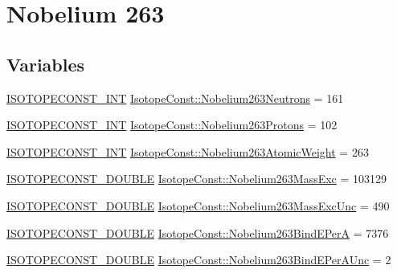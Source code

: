 \hypertarget{group___isotope_const-_nobelium-_no263}{}\section{Nobelium 263}
\label{group___isotope_const-_nobelium-_no263}
\subsection*{Variables}
\begin{DoxyCompactItemize}
\item 
\mbox{\hyperlink{group___isotope_const-_macros_ga5f18360b3e99483a35c32d789e62621c}{I\+S\+O\+T\+O\+P\+E\+C\+O\+N\+S\+T\+\_\+\+I\+NT}} \mbox{\hyperlink{group___isotope_const-_nobelium-_no263_gaed4156afb538ce2c36378a25ada4008c}{Isotope\+Const\+::\+Nobelium263\+Neutrons}} = 161
\item 
\mbox{\hyperlink{group___isotope_const-_macros_ga5f18360b3e99483a35c32d789e62621c}{I\+S\+O\+T\+O\+P\+E\+C\+O\+N\+S\+T\+\_\+\+I\+NT}} \mbox{\hyperlink{group___isotope_const-_nobelium-_no263_ga6154b5a9ceac61e70e11601ed8ffc2dc}{Isotope\+Const\+::\+Nobelium263\+Protons}} = 102
\item 
\mbox{\hyperlink{group___isotope_const-_macros_ga5f18360b3e99483a35c32d789e62621c}{I\+S\+O\+T\+O\+P\+E\+C\+O\+N\+S\+T\+\_\+\+I\+NT}} \mbox{\hyperlink{group___isotope_const-_nobelium-_no263_ga91f92e14a512138d7ae864bbab7fe4e2}{Isotope\+Const\+::\+Nobelium263\+Atomic\+Weight}} = 263
\item 
\mbox{\hyperlink{group___isotope_const-_macros_ga8f45a7272ce02c0b4c65c44636ed719a}{I\+S\+O\+T\+O\+P\+E\+C\+O\+N\+S\+T\+\_\+\+D\+O\+U\+B\+LE}} \mbox{\hyperlink{group___isotope_const-_nobelium-_no263_ga46fcd33c52aae803cac7c14f2fa99e83}{Isotope\+Const\+::\+Nobelium263\+Mass\+Exc}} = 103129
\item 
\mbox{\hyperlink{group___isotope_const-_macros_ga8f45a7272ce02c0b4c65c44636ed719a}{I\+S\+O\+T\+O\+P\+E\+C\+O\+N\+S\+T\+\_\+\+D\+O\+U\+B\+LE}} \mbox{\hyperlink{group___isotope_const-_nobelium-_no263_ga64a7565dba4a6623602af4562fa977e1}{Isotope\+Const\+::\+Nobelium263\+Mass\+Exc\+Unc}} = 490
\item 
\mbox{\hyperlink{group___isotope_const-_macros_ga8f45a7272ce02c0b4c65c44636ed719a}{I\+S\+O\+T\+O\+P\+E\+C\+O\+N\+S\+T\+\_\+\+D\+O\+U\+B\+LE}} \mbox{\hyperlink{group___isotope_const-_nobelium-_no263_gad5c28558542b79dc7d5c902259d670a7}{Isotope\+Const\+::\+Nobelium263\+Bind\+E\+PerA}} = 7376
\item 
\mbox{\hyperlink{group___isotope_const-_macros_ga8f45a7272ce02c0b4c65c44636ed719a}{I\+S\+O\+T\+O\+P\+E\+C\+O\+N\+S\+T\+\_\+\+D\+O\+U\+B\+LE}} \mbox{\hyperlink{group___isotope_const-_nobelium-_no263_ga5e59d8dbdc8d47590b82cbaf2c362b3d}{Isotope\+Const\+::\+Nobelium263\+Bind\+E\+Per\+A\+Unc}} = 2

\end{DoxyCompactItemize}
